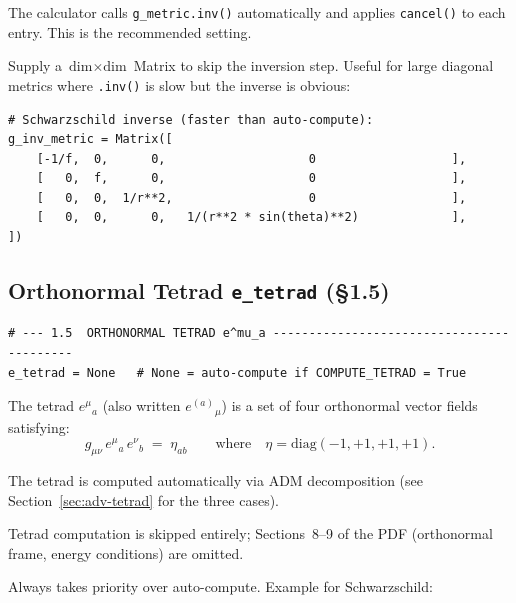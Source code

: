 \documentclass[11pt,a4paper]{article}
\newcommand{\code}[1]{\texttt{\small#1}}
\begin{document}
\begin{description}[leftmargin=2cm,style=nextline]
  \item[\code{None}]
    The calculator calls \code{g\_metric.inv()} automatically and applies
    \code{cancel()} to each entry.  This is the recommended setting.

  \item[Manual matrix]
    Supply a $\text{dim}\times\text{dim}$ Matrix to skip the inversion step.
    Useful for large diagonal metrics where \code{.inv()} is slow but the
    inverse is obvious:
\end{description}

\begin{lstlisting}
# Schwarzschild inverse (faster than auto-compute):
g_inv_metric = Matrix([
    [-1/f,  0,      0,                    0                   ],
    [   0,  f,      0,                    0                   ],
    [   0,  0,  1/r**2,                   0                   ],
    [   0,  0,      0,   1/(r**2 * sin(theta)**2)             ],
])
\end{lstlisting}

\subsection{Orthonormal Tetrad \code{e\_tetrad} (\S1.5)}
\label{sec:cfg-tetrad}

\begin{lstlisting}
# --- 1.5  ORTHONORMAL TETRAD e^mu_a ------------------------------------------
e_tetrad = None   # None = auto-compute if COMPUTE_TETRAD = True
\end{lstlisting}

The tetrad $e^\mu{}_a$ (also written $e^{(a)}{}_\mu$) is a set of four
orthonormal vector fields satisfying:
\[
  g_{\mu\nu}\, e^\mu{}_a\, e^\nu{}_b \;=\; \eta_{ab}
  \qquad \text{where}\quad
  \eta = \mathrm{diag}(-1,+1,+1,+1).
\]

\begin{description}[leftmargin=2cm,style=nextline]
  \item[\code{None} + \code{COMPUTE\_TETRAD = True}]
    The tetrad is computed automatically via ADM decomposition
    (see Section~\ref{sec:adv-tetrad} for the three cases).

  \item[\code{None} + \code{COMPUTE\_TETRAD = False}]
    Tetrad computation is skipped entirely; Sections~8--9 of the PDF
    (orthonormal frame, energy conditions) are omitted.

  \item[User-supplied Matrix]
    Always takes priority over auto-compute.  Example for Schwarzschild:
\end{description}
\end{document}

